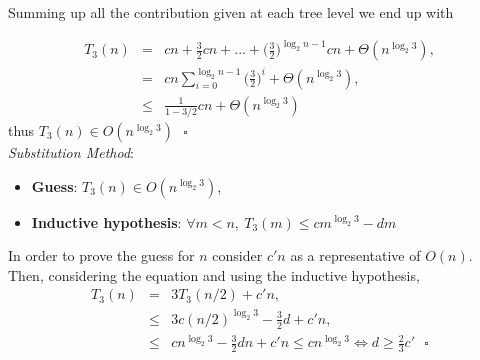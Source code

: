 \documentclass{article}
\begin{document}
\begin{figure}[h]
\begin{center}
			\label{recursion_tree_3}
		\end{center}
		
	\end{figure}
	\noindent Summing up all the contribution given at each tree level we end up with
	
	\begin{eqnarray}
	\nonumber
	T_3(n) &=& cn + \frac{3}{2} cn + ... + \Bigg( \frac{3}{2} \Bigg)^{\log_2 n-1} cn + \Theta(n^{\log_2 3}),\\
	\nonumber
	&=& cn \sum_{i=0}^{\log_2 n - 1} \Bigg( \frac{3}{2} \Bigg)^i + \Theta(n^{\log_2 3}), \\
	\nonumber
	&\leq& \frac{1}{1-3/2}cn + \Theta(n^{\log_2 3})
	\end{eqnarray}
	\noindent thus $T_3(n) \in O(n^{\log_2 3}) ~~~ \square$\\


	\noindent \textit{Substitution Method}:
	\begin{itemize}
		\item \textbf{Guess}: $T_3(n) \in O(n^{\log_2 3})$,
		\item \textbf{Inductive hypothesis}: $\forall m < n, ~  T_3(m) \leq cm^{\log_2 3} - dm$
	\end{itemize}   
	In order to prove the guess for $n$ consider $c'n$ as a representative of $O(n)$. Then, considering the equation and using the inductive hypothesis,
	\begin{eqnarray}
	\nonumber
	T_3(n) &=& 3 T_3 (n/2) + c'n,\\
	\nonumber
	&\leq& 3 c (n/2)^{\log_2 3} - \frac{3}{2}d + c'n,\\
	\nonumber
	&\leq& cn^{\log_2 3} - \frac{3}{2} dn + c'n \leq  cn^{\log_2 3}  \Leftrightarrow d \geq \frac{2}{3} c' ~~~ \square
	\nonumber 
	\end{eqnarray} 
	
\end{document}
